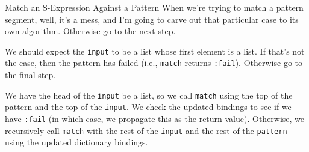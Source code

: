 \begin{algorithm}{Match an S-Expression Against a Pattern}
\label{algorithm:step:lisp:matching:trying-to-match-pattern-segment}
When we're trying to match a pattern segment, well, it's a mess, and I'm
going to carve out that particular case to its own algorithm. Otherwise
go to the next step.

We should expect the
\lstinline[language=lisp]{input} to be a list whose first element is a list.
If that's not the case, then the pattern has failed (i.e.,
\lstinline[language=lisp]{match} returns \lstinline[language=lisp]{:fail}).
Otherwise go to the final step.

We have the head of the \lstinline[language=lisp]{input} be
a list, so we call \lstinline[language=lisp]{match} using the top of the
pattern and the top of the \lstinline[language=lisp]{input}. We check
the updated bindings to see if we have \lstinline[language=lisp]{:fail}
(in which case, we propagate this as the return value). Otherwise, we
recursively call \lstinline[language=lisp]{match}
with the rest of the \lstinline[language=lisp]{input} and the
rest of the \lstinline[language=lisp]{pattern} using the updated
dictionary bindings.\quad\qedsymbol
\end{algorithm}

